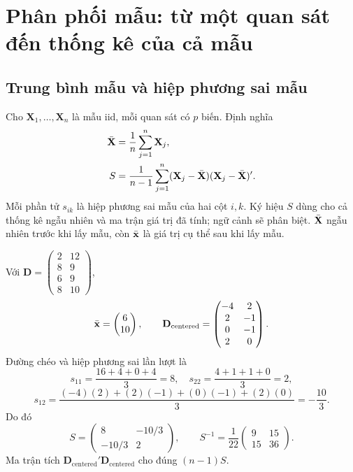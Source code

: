 \clearpage
\section{Phân phối mẫu: từ một quan sát đến thống kê của cả mẫu}
\label{sec:sampling}

\subsection{Trung bình mẫu và hiệp phương sai mẫu}
Cho $\mathbf X_1,\ldots,\mathbf X_n$ là mẫu iid, mỗi quan sát có $p$ biến.
Định nghĩa
\begin{align}
 \bar{\mathbf X}&=\frac1n\sum_{j=1}^n\mathbf X_j,
 \label{eq:samplemean}\\
 S&=\frac1{n-1}\sum_{j=1}^n
 (\mathbf X_j-\bar{\mathbf X})(\mathbf X_j-\bar{\mathbf X})'.
 \label{eq:samplecov}
\end{align}
Mỗi phần tử $s_{ik}$ là hiệp phương sai mẫu của hai cột $i,k$.
Ký hiệu $S$ dùng cho cả thống kê ngẫu nhiên và ma trận giá trị đã tính;
ngữ cảnh sẽ phân biệt. $\bar{\mathbf X}$ ngẫu nhiên trước khi lấy mẫu, còn $\bar{\mathbf x}$
là giá trị cụ thể sau khi lấy mẫu.

\begin{example}
Với $\mathbf D=\begin{pmatrix}2&12\\8&9\\6&9\\8&10\end{pmatrix}$,
\[
 \bar{\mathbf x}=\begin{pmatrix}6\\10\end{pmatrix},\qquad
 \mathbf D_{\mathrm{centered}}=
 \begin{pmatrix}-4&2\\2&-1\\0&-1\\2&0\end{pmatrix}.
\]
Đường chéo và hiệp phương sai lần lượt là
\[
 s_{11}=\frac{16+4+0+4}{3}=8,\quad
 s_{22}=\frac{4+1+1+0}{3}=2,
\]
\[
 s_{12}=\frac{(-4)(2)+(2)(-1)+(0)(-1)+(2)(0)}3=-\frac{10}3.
\]
Do đó
\begin{equation}
 S=\begin{pmatrix}8&-10/3\\-10/3&2\end{pmatrix},\qquad
 S^{-1}=\frac1{22}\begin{pmatrix}9&15\\15&36\end{pmatrix}.
 \label{eq:sample4}
\end{equation}
Ma trận tích $\mathbf D_{\mathrm{centered}}'
\mathbf D_{\mathrm{centered}}$ cho đúng $(n-1)S$.
\end{example}


